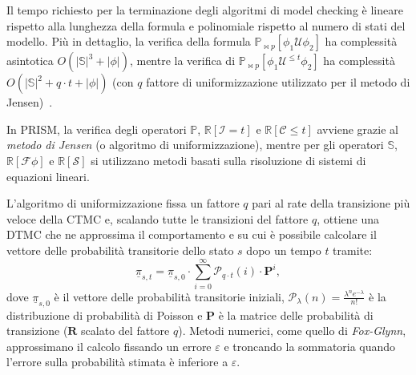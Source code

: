 	Il tempo richiesto per la terminazione degli algoritmi di model checking \`e lineare rispetto alla lunghezza della formula e polinomiale rispetto al numero di stati del modello. Pi\`u in dettaglio, la verifica della formula $\mathbb{P}_{\bowtie p} [\phi_1 \mathcal{U} \phi_2]$ ha complessit\`a asintotica $O(|\mathbb{S}|^3 + |\phi|)$, mentre la verifica di $\mathbb{P}_{\bowtie p} [\phi_1 \mathcal{U}^{\leq t} \phi_2]$ ha complessit\`a $O(|\mathbb{S}|^2 + q \cdot t + |\phi|)$ (con $q$ fattore di uniformizzazione utilizzato per il metodo di Jensen)~\cite{ctmc}.

	In PRISM, la verifica degli operatori $\mathbb{P}$, $\mathbb{R}[\mathcal{I} = t]$ e $\mathbb{R}[\mathcal{C} \leq t]$ avviene grazie al \emph{metodo di Jensen} (o algoritmo di uniformizzazione), mentre per gli operatori $\mathbb{S}$, $\mathbb{R}[\mathcal{F}  \phi]$ e $\mathbb{R}[\mathcal{S}]$ si utilizzano metodi basati sulla risoluzione di sistemi di equazioni lineari.
	
	L'algoritmo di uniformizzazione fissa un fattore $q$ pari al rate della transizione pi\`u veloce della CTMC e, scalando tutte le transizioni del fattore $q$, ottiene una DTMC che ne approssima il comportamento e su cui \`e possibile calcolare il vettore delle probabilit\`a transitorie dello stato $s$ dopo un tempo $t$ tramite:
	\begin{equation*}
		\underline{\pi}_{s,t} = \underline{\pi}_{s, 0} \cdot \sum\limits_{i = 0}^{\infty} \mathcal{P}_{q\cdot t}(i) \cdot \mathbf{P}^i,
	\end{equation*}
	dove $\underline{\pi}_{s, 0}$ \`e il vettore delle probabilit\`a transitorie iniziali, $\mathcal{P}_\lambda(n) = \frac{\lambda^n e^{-\lambda}}{n!}$ \`e la distribuzione di probabilit\`a di Poisson e $\mathbf{P}$ \`e la matrice delle probabilit\`a di transizione ($\mathbf{R}$ scalato del fattore $q$).
	Metodi numerici, come quello di \emph{Fox-Glynn}, approssimano il calcolo fissando un errore $\varepsilon$ e troncando la sommatoria quando l'errore sulla probabilit\`a stimata \`e inferiore a $\varepsilon$.
	
